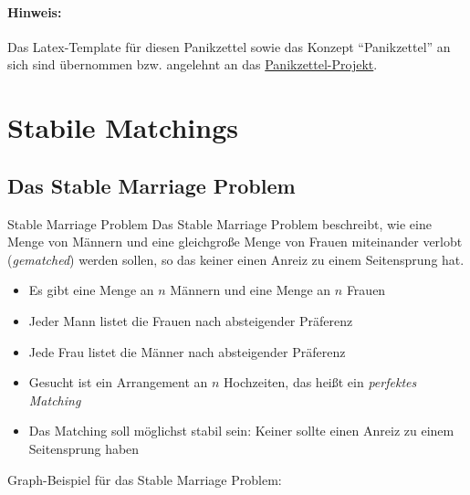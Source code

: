 \documentclass{panikzettel}
\begin{document}
{\small{}
	\paragraph{Hinweis:}
	Das Latex-Template für diesen Panikzettel sowie das Konzept ``Panikzettel'' an sich sind übernommen bzw. angelehnt an das \href{https://git.rwth-aachen.de/philipp.schroer/panikzettel}{Panikzettel-Projekt}.

\section{Stabile Matchings}

\subsection{Das Stable Marriage Problem}

\begin{halfboxl}
	\vspace{-\baselineskip}
	\begin{defi}{Stable Marriage Problem}
	Das Stable Marriage Problem beschreibt, wie eine Menge von Männern und eine gleichgroße Menge von Frauen miteinander verlobt (\emph{gematched}) werden sollen, so das keiner einen Anreiz zu einem Seitensprung hat.\\
	
	\begin{itemize}
		\item Es gibt eine Menge an $n$ Männern und eine Menge an $n$ Frauen
		\item Jeder Mann listet die Frauen nach absteigender Präferenz
		\item Jede Frau listet die Männer nach absteigender Präferenz
		\item Gesucht ist ein Arrangement an $n$ Hochzeiten, das heißt ein \emph{perfektes Matching}
		\item Das Matching soll möglichst stabil sein: Keiner sollte einen Anreiz zu einem Seitensprung haben
	\end{itemize}
	\end{defi}
\end{halfboxl}%
\begin{halfboxr}
	 \vspace{-\baselineskip}
	Graph-Beispiel für das Stable Marriage Problem:\\
	
	\begin{center}
\end{center}
\end{halfboxr}}
\end{document}
